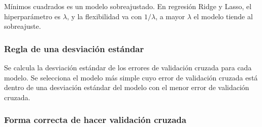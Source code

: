 \begin{example}
Mínimos cuadrados es un modelo sobreajustado. En regresión Ridge y Lasso, el hiperparámetro es $\lambda$, y la flexibilidad va con $1/\lambda$, a mayor $\lambda$ el modelo tiende al sobreajuste. 
\end{example}

\subsubsection{Regla de una desviación estándar}

Se calcula la desviación estándar de los errores de validación cruzada para cada modelo. Se selecciona el modelo más simple cuyo error de validación cruzada está dentro de una desviación estándar del modelo con el menor error de validación cruzada.

\subsubsection{Forma correcta de hacer validación cruzada}


